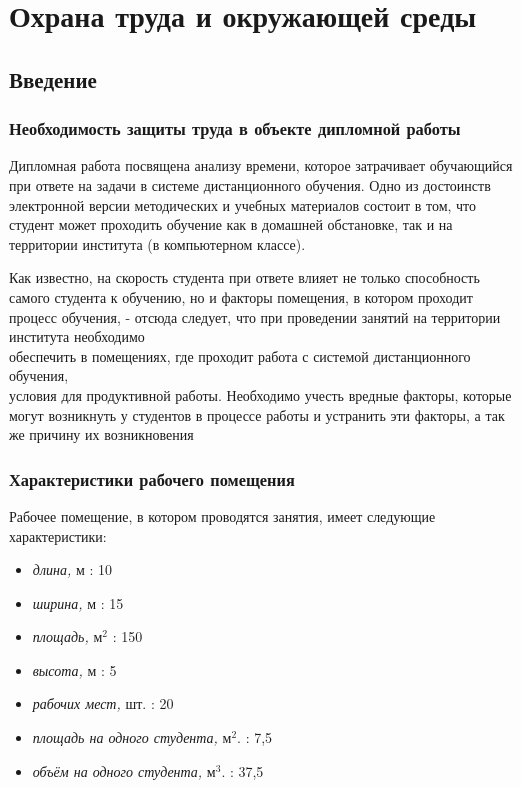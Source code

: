  \chapter{Охрана труда и окружающей среды}
\label{mainpart}  
\section{Введение}

\subsection{Необходимость защиты труда в объекте дипломной работы}

Дипломная работа посвящена анализу времени, которое затрачивает обу\-чающийся при ответе на задачи в системе дистанционного обучения. Одно из достоинств электронной версии методических и учебных материалов состоит в том, что студент может проходить обучение как в домашней обстановке, так и на территории института (в компьютерном классе). 

Как известно, на скорость студента при ответе влияет не только способ\-ность самого студента к обучению, но и факторы помещения, в котором проходит процесс обучения, - отсюда следует, что при проведении занятий на территории института необходимо \\ обеспечить в помещениях, где проходит работа с системой дистанционного обучения,\\ условия для продуктивной работы. Необходимо учесть вредные факторы, которые могут возникнуть у студентов в процессе работы и устранить эти факторы, а так же причину их возникновения

\subsection{Характеристики рабочего помещения}
\label{hro}

Рабочее помещение, в котором проводятся занятия, имеет следующие ха\-рактеристики:

\begin{itemize}
\item {\itshape длина,} м : 10
\item {\itshape ширина,} м : 15
\item {\itshape площадь,} м$^2$ : 150
\item {\itshape высота,} м : 5
\item {\itshape рабочих мест,} шт. : 20
\item {\itshape площадь на одного студента,} м$^2$. : 7,5
\item {\itshape объём на одного студента,} м$^3$. : 37,5
\end{itemize}

